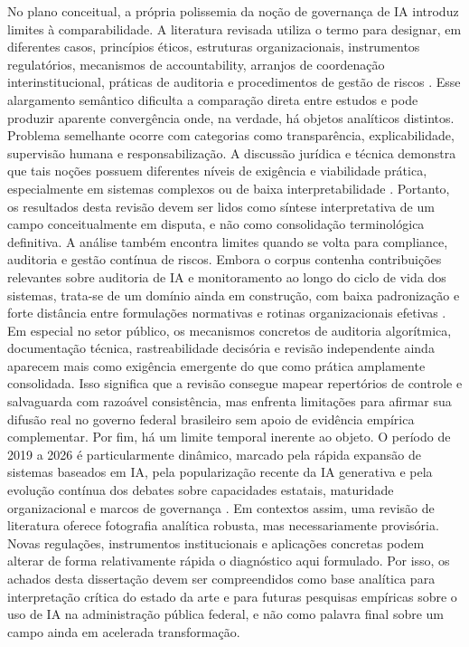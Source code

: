 \documentclass[12pt,a4paper]{article}
\begin{document}
No plano conceitual, a própria polissemia da noção de governança de IA introduz limites à comparabilidade. A literatura revisada utiliza o termo para designar, em diferentes casos, princípios éticos, estruturas organizacionais, instrumentos regulatórios, mecanismos de accountability, arranjos de coordenação interinstitucional, práticas de auditoria e procedimentos de gestão de riscos \autocite{batool2025ai} \autocite{sigfrids2022how} \autocite{goulart2025processos}. Esse alargamento semântico dificulta a comparação direta entre estudos e pode produzir aparente convergência onde, na verdade, há objetos analíticos distintos. Problema semelhante ocorre com categorias como transparência, explicabilidade, supervisão humana e responsabilização. A discussão jurídica e técnica demonstra que tais noções possuem diferentes níveis de exigência e viabilidade prática, especialmente em sistemas complexos ou de baixa interpretabilidade \autocite{brkan2020legal} \autocite{parycek2023artificial}. Portanto, os resultados desta revisão devem ser lidos como síntese interpretativa de um campo conceitualmente em disputa, e não como consolidação terminológica definitiva.
A análise também encontra limites quando se volta para compliance, auditoria e gestão contínua de riscos. Embora o corpus contenha contribuições relevantes sobre auditoria de IA e monitoramento ao longo do ciclo de vida dos sistemas, trata-se de um domínio ainda em construção, com baixa padronização e forte distância entre formulações normativas e rotinas organizacionais efetivas \autocite{mkander2023auditing} \autocite{minkkinen2022continuous}. Em especial no setor público, os mecanismos concretos de auditoria algorítmica, documentação técnica, rastreabilidade decisória e revisão independente ainda aparecem mais como exigência emergente do que como prática amplamente consolidada. Isso significa que a revisão consegue mapear repertórios de controle e salvaguarda com razoável consistência, mas enfrenta limitações para afirmar sua difusão real no governo federal brasileiro sem apoio de evidência empírica complementar.
Por fim, há um limite temporal inerente ao objeto. O período de 2019 a 2026 é particularmente dinâmico, marcado pela rápida expansão de sistemas baseados em IA, pela popularização recente da IA generativa e pela evolução contínua dos debates sobre capacidades estatais, maturidade organizacional e marcos de governança \autocite{mariano2026inteligencia} \autocite{melo2026competencias} \autocite{barros2025inteligencia}. Em contextos assim, uma revisão de literatura oferece fotografia analítica robusta, mas necessariamente provisória. Novas regulações, instrumentos institucionais e aplicações concretas podem alterar de forma relativamente rápida o diagnóstico aqui formulado. Por isso, os achados desta dissertação devem ser compreendidos como base analítica para interpretação crítica do estado da arte e para futuras pesquisas empíricas sobre o uso de IA na administração pública federal, e não como palavra final sobre um campo ainda em acelerada transformação.
\end{document}
